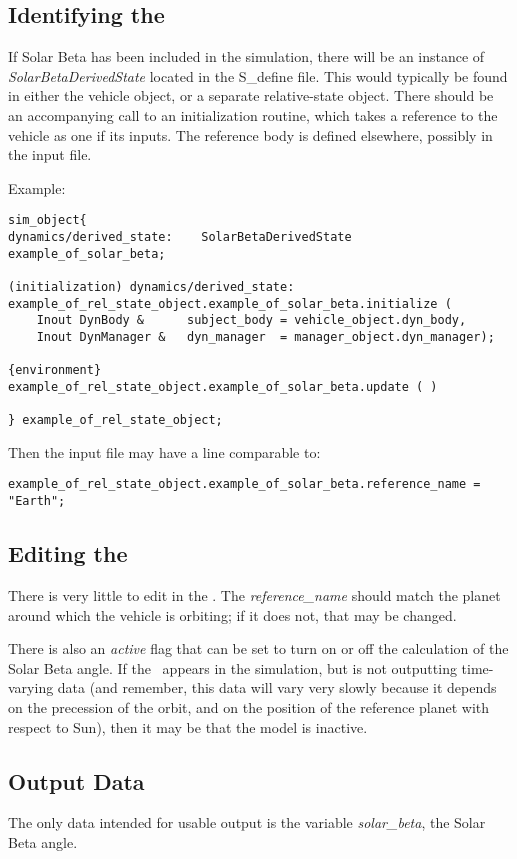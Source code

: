 %
%
% 
%

\label{sec:solarbetauseranalysis}

\subsection{Identifying the \SolarBetaDescT}
If Solar Beta has been included in the simulation, there will be an instance of \textit{SolarBetaDerivedState} located in the S\_define file.  This would typically be found in either the vehicle object, or a separate relative-state object.  There should be an accompanying call to an initialization routine, which takes a reference to the vehicle as one if its inputs.  The reference body is defined elsewhere, possibly in the input file.

Example:
\begin{verbatim}
sim_object{
dynamics/derived_state:    SolarBetaDerivedState example_of_solar_beta;

(initialization) dynamics/derived_state:
example_of_rel_state_object.example_of_solar_beta.initialize (
    Inout DynBody &      subject_body = vehicle_object.dyn_body,
    Inout DynManager &   dyn_manager  = manager_object.dyn_manager);
    
{environment}
example_of_rel_state_object.example_of_solar_beta.update ( )

} example_of_rel_state_object;
\end{verbatim}

Then the input file may have a line comparable to:
\begin{verbatim}
example_of_rel_state_object.example_of_solar_beta.reference_name = "Earth";
\end{verbatim}


\subsection{Editing the \SolarBetaDescT}
There is very little to edit in the \SolarBetaDesc.  The \textit{reference\_name} should match the planet around which the vehicle is orbiting; if it does not, that may be changed.

There is also an \textit{active} flag that can be set to turn on or off the calculation of the Solar Beta angle.  If the \SolarBetaDesc\ appears in the simulation, but is not outputting time-varying data (and remember, this data will vary very slowly because it depends on the precession of the orbit, and on the position of the reference planet with respect to Sun), then it may be that the model is inactive. 

\subsection{Output Data}
The only data intended for usable output is the variable \textit{solar\_beta}, the Solar Beta angle.
